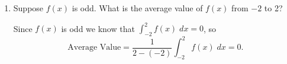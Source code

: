 \documentclass[11pt]{article}
\begin{document}
\pagestyle{empty}
\newsavebox{\quizfront}
\begin{lrbox}{\quizfront}
\begin{minipage}[top][4.5in][t]{\textwidth} \setlength{\parindent}{1.5em}
\drawtitle
\vspace{-0.5in}
\begin{enumerate}

\item Suppose $f(x)$ is odd. What is the average value of $f(x)$ from
  $-2$ to 2?
  \vfill
  {\color{blue}
    
    Since $f(x)$ is odd we know that $\int_{-2}^2 f(x)\; dx = 0$, so
    \[
    \text{Average Value} = \frac{1}{2-(-2)}\int_{-2}^2 f(x)\; dx = 0.
    \]

  }
  \vfill


\end{enumerate}




\end{minipage}
\end{lrbox}
\end{document}

